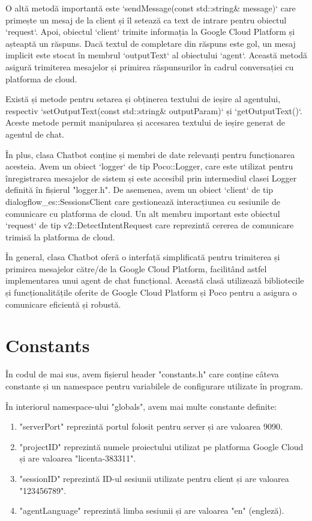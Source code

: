 O altă metodă importantă este `sendMessage(const std::string\& message)` care primește un mesaj de la client și îl setează ca text de intrare pentru obiectul `request`. Apoi, obiectul `client` trimite informația la Google Cloud Platform și așteaptă un răspuns. Dacă textul de completare din răspuns este gol, un mesaj implicit este stocat în membrul `outputText` al obiectului `agent`. Această metodă asigură trimiterea mesajelor și primirea răspunsurilor în cadrul conversației cu platforma de cloud.

Există și metode pentru setarea și obținerea textului de ieșire al agentului, respectiv `setOutputText(const std::string\& outputParam)` și `getOutputText()`. Aceste metode permit manipularea și accesarea textului de ieșire generat de agentul de chat.

În plus, clasa Chatbot conține și membri de date relevanți pentru funcționarea acesteia. Avem un obiect `logger` de tip Poco::Logger, care este utilizat pentru înregistrarea mesajelor de sistem și este accesibil prin intermediul clasei Logger definită în fișierul "logger.h". De asemenea, avem un obiect `client` de tip dialogflow\_es::SessionsClient care gestionează interacțiunea cu sesiunile de comunicare cu platforma de cloud. Un alt membru important este obiectul `request` de tip v2::DetectIntentRequest care reprezintă cererea de comunicare trimisă la platforma de cloud.

În general, clasa Chatbot oferă o interfață simplificată pentru trimiterea și primirea mesajelor către/de la Google Cloud Platform, facilitând astfel implementarea unui agent de chat funcțional. Această clasă utilizează bibliotecile și funcționalitățile oferite de Google Cloud Platform și Poco pentru a asigura o comunicare eficientă și robustă.

\section{Constants}

În codul de mai sus, avem fișierul header "constants.h" care conține câteva constante și un namespace pentru variabilele de configurare utilizate în program.

În interiorul namespace-ului "globals", avem mai multe constante definite:
\begin{enumerate}
    \item "serverPort" reprezintă portul folosit pentru server și are valoarea 9090.
    \item "projectID" reprezintă numele proiectului utilizat pe platforma Google Cloud și are valoarea "licenta-383311".
    \item "sessionID" reprezintă ID-ul sesiunii utilizate pentru client și are valoarea "123456789".
    \item "agentLanguage" reprezintă limba sesiunii și are valoarea "en" (engleză).
\end{enumerate}

